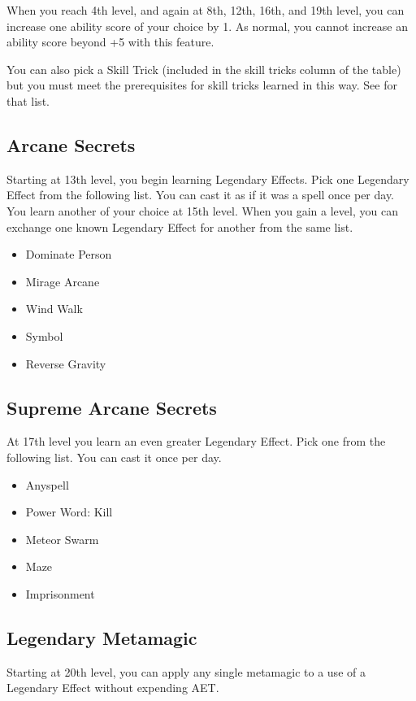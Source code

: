 When you reach 4th level, and again at 8th, 12th, 16th, and 19th level, you can increase one ability score of your choice by 1. As normal, you cannot increase an ability score beyond +5 with this feature.

You can also pick a Skill Trick (included in the skill tricks column of the  table) but you must meet the prerequisites for skill tricks learned in this way. See  for that list.

\subsection{Arcane Secrets}
Starting at 13th level, you begin learning Legendary Effects. Pick one Legendary Effect from the following list. You can cast it as if it was a spell once per day. You learn another of your choice at 15th level. When you gain a level, you can exchange one known Legendary Effect for another from the same list.

\begin{itemize}
  \item Dominate Person
  \item Mirage Arcane
  \item Wind Walk
  \item Symbol
  \item Reverse Gravity
\end{itemize}

\subsection{Supreme Arcane Secrets}
At 17th level you learn an even greater Legendary Effect. Pick one from the following list. You can cast it once per day.

\begin{itemize}
  \item Anyspell
  \item Power Word: Kill
  \item Meteor Swarm
  \item Maze
  \item Imprisonment
\end{itemize}

\subsection{Legendary Metamagic}
Starting at 20th level, you can apply any single metamagic to a use of a Legendary Effect without expending AET.

